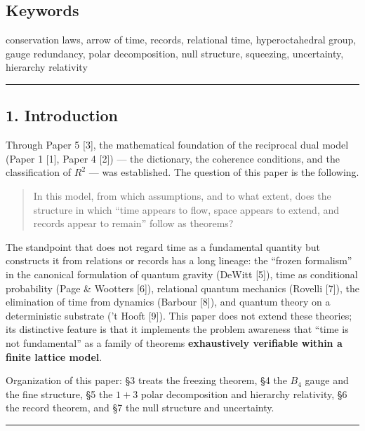 \documentclass[
]{article}
\begin{document}
\subsection{Keywords}\label{keywords}

conservation laws, arrow of time, records, relational time,
hyperoctahedral group, gauge redundancy, polar decomposition, null
structure, squeezing, uncertainty, hierarchy relativity

\begin{center}\rule{0.5\linewidth}{0.5pt}\end{center}

\subsection{1. Introduction}\label{introduction}

Through Paper 5 {[}3{]}, the mathematical foundation of the reciprocal
dual model (Paper 1 {[}1{]}, Paper 4 {[}2{]}) --- the dictionary, the
coherence conditions, and the classification of \(R^2\) --- was
established. The question of this paper is the following.

\begin{quote}
In this model, from which assumptions, and to what extent, does the
structure in which ``time appears to flow, space appears to extend, and
records appear to remain'' follow as theorems?
\end{quote}

The standpoint that does not regard time as a fundamental quantity but
constructs it from relations or records has a long lineage: the ``frozen
formalism'' in the canonical formulation of quantum gravity (DeWitt
{[}5{]}), time as conditional probability (Page \& Wootters {[}6{]}),
relational quantum mechanics (Rovelli {[}7{]}), the elimination of time
from dynamics (Barbour {[}8{]}), and quantum theory on a deterministic
substrate ('t Hooft {[}9{]}). This paper does not extend these theories;
its distinctive feature is that it implements the problem awareness that
``time is not fundamental'' as a family of theorems \textbf{exhaustively
verifiable within a finite lattice model}.

Organization of this paper: §3 treats the freezing theorem, §4 the
\(B_4\) gauge and the fine structure, §5 the \(1{+}3\) polar
decomposition and hierarchy relativity, §6 the record theorem, and §7
the null structure and uncertainty.

\begin{center}\rule{0.5\linewidth}{0.5pt}\end{center}
\end{document}

